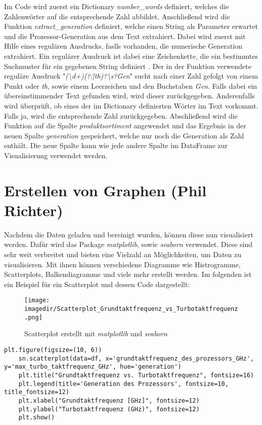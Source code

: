 Im Code wird zuerst ein Dictionary \cite{noauthor_5_nodate} \textit{number\_words} definiert, welches die Zahlenwörter auf die entsprechende Zahl abbildet.
Anschließend wird die Funktion \textit{extract\_generation} definiert, welche einen String als Parameter erwartet und die Prozessor-Generation aus dem Text extrahiert.
Dabei wird zuerst mit Hilfe eines regulären Ausdrucks, faslls vorhanden, die numerische Generation extrahiert. Ein regulärer Ausdruck ist dabei eine Zeichenkette,
die ein bestimmtes Suchmuster für ein gegebenen String definiert \cite{adegeo_regular_2022}.
Der in der Funktion verwendete reguläre Ausdruck "\textit{(\textbackslash d+)(?:\.|th)?\textbackslash s?Gen}" sucht nach einer Zahl gefolgt von einem Punkt oder \textit{th},
sowie einem Leerzeichen und den Buchstaben \textit{Gen}. Falls dabei ein übereinstimmender Text gefunden wird, wird dieser zurückgegeben. Anderenfalls wird
überprüft, ob eines der im Dictionary definierten Wörter im Text vorkommt. Falls ja, wird die entsprechende Zahl zurückgegeben.
Abschließend wird die Funktion auf die Spalte \textit{produktsortiment} angewendet und das Ergebnis in der neuen Spalte \textit{generation} gespeichert, welche nur noch die
Generation als Zahl enthält.
Die neue Spalte kann wie jede andere Spalte im DataFrame zur Visualisierung verwendet werden.

\section{Erstellen von Graphen (Phil Richter)}
Nachdem die Daten geladen und bereinigt wurden, können diese nun visualisiert werden. Dafür wird das Package \textit{matplotlib}, sowie \textit{seaborn} verwendet.
Diese sind sehr weit verbreitet und bieten eine Vielzahl an Möglichkeiten, um Daten zu visualisieren. Mit ihnen können verschiedene Diagramme wie Histrogramme,
Scatterplots, Balkendiagramme und viele mehr erstellt werden. Im folgenden ist ein Beispiel für ein Scatterplot und dessen Code dargestellt:

\begin{figure}[H]
	\centering 
	\texttt{[image: \\imagedir/Scatterplot\_Grundtaktfrequenz\_vs\_Turbotaktfrequenz.png]} 
	\captionsetup{format=hang}
	\caption[Scatterplot]{\label{fig:scatterplot_Grundtaktfrequenz}Scatterplot erstellt mit \textit{matplotlib} und \textit{seaborn}}
\end{figure}

\begin{lstlisting}[caption={\texttt{Code für den Scatterplot in Figur 5.1}},captionpos=b]
    plt.figure(figsize=(10, 6))
    sn.scatterplot(data=df, x='grundtaktfrequenz_des_prozessors_GHz', y='max_turbo_taktfrequenz_GHz', hue='generation')
    plt.title("Grundtaktfrequenz vs. Turbotaktfrequenz", fontsize=16)
    plt.legend(title='Generation des Prozessors', fontsize=10, title_fontsize=12)
    plt.xlabel("Grundtaktfrequenz [GHz]", fontsize=12)
    plt.ylabel("Turbotaktfrequenz (GHz)", fontsize=12)
    plt.show()
\end{lstlisting}

